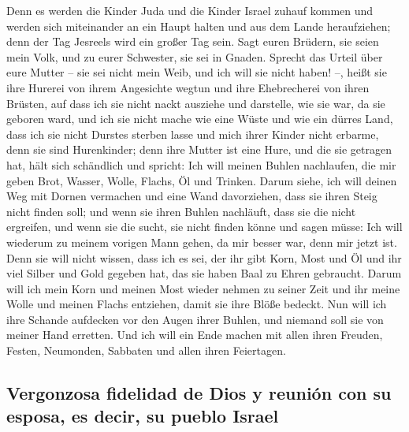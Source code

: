  Denn es werden die Kinder Juda und die Kinder Israel
zuhauf kommen und werden sich miteinander an ein Haupt halten und aus
dem Lande heraufziehen; denn der Tag Jesreels wird ein großer Tag sein.
 Sagt euren Brüdern, sie seien mein Volk, und zu eurer
Schwester, sie sei in Gnaden.  Sprecht das Urteil über
eure Mutter -- sie sei nicht mein Weib, und ich will sie nicht haben!
--, heißt sie ihre Hurerei von ihrem Angesichte wegtun und ihre
Ehebrecherei von ihren Brüsten,  auf dass ich sie nicht
nackt ausziehe und darstelle, wie sie war, da sie geboren ward, und ich
sie nicht mache wie eine Wüste und wie ein dürres Land, dass ich sie
nicht Durstes sterben lasse  und mich ihrer Kinder nicht
erbarme, denn sie sind Hurenkinder;  denn ihre Mutter ist
eine Hure, und die sie getragen hat, hält sich schändlich und spricht:
Ich will meinen Buhlen nachlaufen, die mir geben Brot, Wasser, Wolle,
Flachs, Öl und Trinken.  Darum siehe, ich will deinen Weg
mit Dornen vermachen und eine Wand davorziehen, dass sie ihren Steig
nicht finden soll;  und wenn sie ihren Buhlen nachläuft,
dass sie die nicht ergreifen, und wenn sie die sucht, sie nicht finden
könne und sagen müsse: Ich will wiederum zu meinem vorigen Mann gehen,
da mir besser war, denn mir jetzt ist.  Denn sie will
nicht wissen, dass ich es sei, der ihr gibt Korn, Most und Öl und ihr
viel Silber und Gold gegeben hat, das sie haben Baal zu Ehren gebraucht.
 Darum will ich mein Korn und meinen Most wieder nehmen
zu seiner Zeit und ihr meine Wolle und meinen Flachs entziehen, damit
sie ihre Blöße bedeckt.  Nun will ich ihre Schande
aufdecken vor den Augen ihrer Buhlen, und niemand soll sie von meiner
Hand erretten.  Und ich will ein Ende machen mit allen
ihren Freuden, Festen, Neumonden, Sabbaten und allen ihren Feiertagen.

\hypertarget{vergonzosa-fidelidad-de-dios-y-reuniuxf3n-con-su-esposa-es-decir-su-pueblo-israel}{%
\subsection{Vergonzosa fidelidad de Dios y reunión con su esposa, es
decir, su pueblo
Israel}\label{vergonzosa-fidelidad-de-dios-y-reuniuxf3n-con-su-esposa-es-decir-su-pueblo-israel}}

